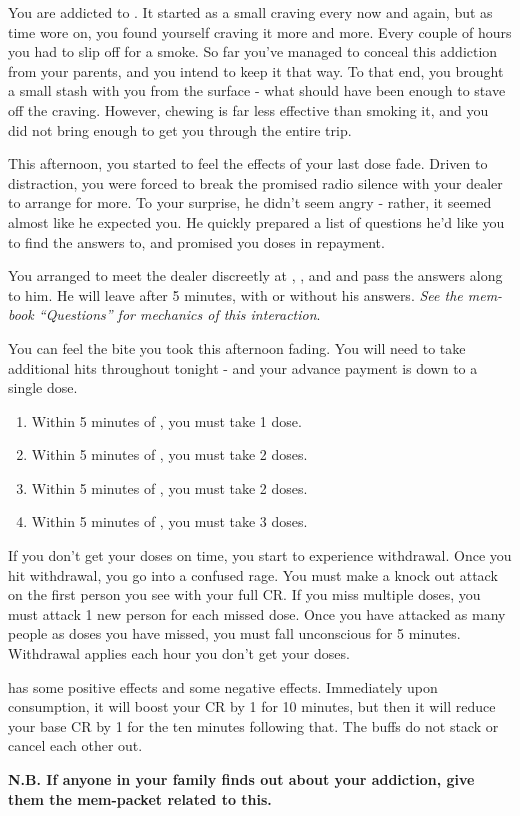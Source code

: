 \documentclass[green]{NeptuneBall}
\begin{document}
\name{\gAddicted{}}

You are addicted to \iDrug{}. It started as a small craving every now and again, but as time wore on, you found yourself craving it more and more. Every couple of hours you had to slip off for a smoke. So far you've managed to conceal this addiction from your parents, and you intend to keep it that way. To that end, you brought a small stash with you from the surface - what should have been enough to stave off the craving. However, chewing \iDrug{} is far less effective than smoking it, and you did not bring enough to get you through the entire trip. 

This afternoon, you started to feel the effects of your last dose fade. Driven to distraction, you were forced to break the promised radio silence with your dealer to arrange for more. To your surprise, he didn't seem angry - rather, it seemed almost like he expected you. He quickly prepared a list of questions he'd like you to find the answers to, and promised you doses in repayment.

You arranged to meet the dealer discreetly at \cTFifteen{\MYname{}}, \cTOneFifteen{\MYname{}}, \cTTwoFifteen{\MYname{}} and \cTThreeFifteen{\MYname{}} and pass the answers along to him. He will leave after 5 minutes, with or without his answers. \emph{See the mem-book ``Questions'' for mechanics of this interaction}.

You can feel the bite you took this afternoon fading. You will need to take additional hits throughout tonight - and your advance payment is down to a single dose.

\begin{enumerate}
	\item Within 5 minutes of \cTFifteen{\MYname{}}, you must take 1 dose.
	\item Within 5 minutes of \cTOneFifteen{\MYname{}}, you must take 2 doses.
	\item Within 5 minutes of \cTTwoFifteen{\MYname{}}, you must take 2 doses.
	\item Within 5 minutes of \cTThreeFifteen{\MYname{}}, you must take 3 doses.
\end{enumerate}

If you don't get your doses on time, you start to experience withdrawal. Once you hit withdrawal, you go into a confused rage. You must make a knock out attack on the first person you see with your full CR. If you miss multiple doses, you must attack 1 new person for each missed dose. Once you have attacked as many people as doses you have missed, you must fall unconscious for 5 minutes. Withdrawal applies each hour you don't get your doses.

\iDrug{} has some positive effects and some negative effects. Immediately upon consumption, it will boost your CR by 1 for 10 minutes, but then it will reduce your base CR by 1 for the ten minutes following that. The buffs do not stack or cancel each other out.

{\bf N.B. If anyone in your family finds out about your addiction, give them the mem-packet related to this.}
\end{document}

